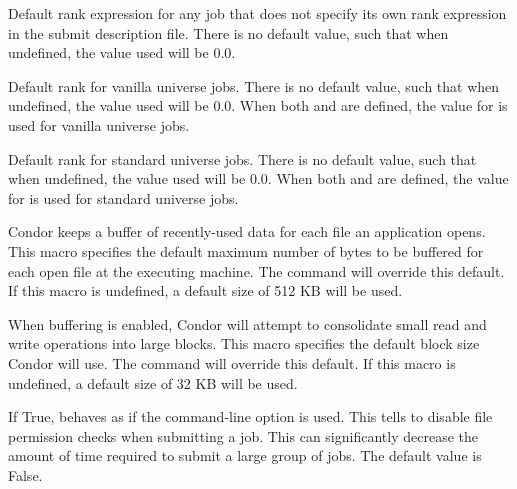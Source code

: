 \begin{description}

\label{param:DefaultRank}
\item[\Macro{DEFAULT\_RANK}]
  Default rank expression for any job that does not specify
  its own rank expression in the submit description file.  
  There is no default value, such that when undefined,
  the value used will be 0.0.

\label{param:DefaultRankVanilla}
\item[\Macro{DEFAULT\_RANK\_VANILLA}]
  Default rank for vanilla universe jobs.  
  There is no default value, such that when undefined,
  the value used will be 0.0.
  When both  and 
  are defined, the value for  is
  used for vanilla universe jobs.

\label{param:DefaultRankStandard}
\item[\Macro{DEFAULT\_RANK\_STANDARD}]
  Default rank for standard universe jobs.
  There is no default value, such that when undefined,
  the value used will be 0.0.
  When both  and 
  are defined, the value for  is
  used for standard universe jobs.

\label{param:DefaultBufferSize}
\item[\Macro{DEFAULT\_IO\_BUFFER\_SIZE}]
  Condor keeps a buffer of recently-used data for each file an
  application opens.  This macro specifies the default maximum number
  of bytes to be buffered for each open file at the executing machine.
  The   command will override this
  default.  If this macro is undefined, a default size of 512 KB will
  be used.

\label{param:DefaultBufferBlockSize}
\item[\Macro{DEFAULT\_IO\_BUFFER\_BLOCK\_SIZE}] 
  When buffering is enabled,
  Condor will attempt to consolidate small read and write operations
  into large blocks.  This macro specifies the default block size
  Condor will use.  The  
  command will override this default.  If this macro is undefined, a
  default size of 32 KB will be used.

\label{param:SubmitSkipFilechecks}
\item[\Macro{SUBMIT\_SKIP\_FILECHECKS}]
  If True,  behaves as if the  
  command-line option is used.
  This tells  to disable file permission checks when
  submitting a job.
  This can significantly decrease the amount of time required to submit
  a large group of jobs.
  The default value is False.


\end{description}
